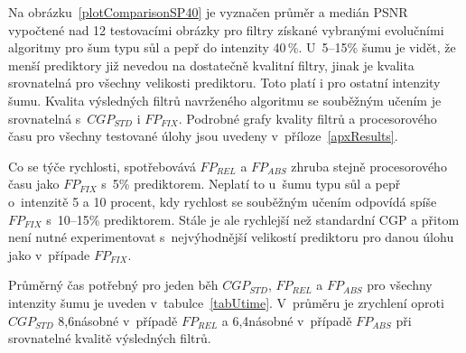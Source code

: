 Na obrázku~\ref{plotComparisonSP40} je vyznačen průměr a medián PSNR vypočtené nad 12 testovacími obrázky pro filtry získané vybranými evolučními algoritmy pro šum typu sůl a pepř do intenzity 40\,\%. U~5--15\% šumu je vidět, že menší prediktory již nevedou na dostatečně kvalitní filtry, jinak je kvalita srovnatelná pro všechny velikosti prediktoru. Toto platí i pro ostatní intenzity šumu. Kvalita výsledných filtrů navrženého algoritmu se souběžným učením je srovnatelná s~$\mathit{CGP_{STD}}$ i $\mathit{FP_{FIX}}$. Podrobné grafy kvality filtrů a procesorového času pro všechny testované úlohy jsou uvedeny v~příloze~\ref{apxResults}.

Co se týče rychlosti, spotřebovává $\mathit{FP_{REL}}$ a $\mathit{FP_{ABS}}$ zhruba stejně procesorového času jako $\mathit{FP_{FIX}}$ s~5\% prediktorem. Neplatí to u~šumu typu sůl a pepř o~intenzitě 5 a 10 procent, kdy rychlost se souběžným učením odpovídá spíše $\mathit{FP_{FIX}}$ s~10--15\% prediktorem. Stále je ale rychlejší než standardní CGP a přitom není nutné experimentovat s~nejvýhodnější velikostí prediktoru pro danou úlohu jako v~případe $\mathit{FP_{FIX}}$.

Průměrný čas potřebný pro jeden běh $\mathit{CGP_{STD}}$, $\mathit{FP_{REL}}$ a $\mathit{FP_{ABS}}$ pro všechny intenzity šumu je uveden v~tabulce~\ref{tabUtime}. V~průměru je zrychlení oproti $\mathit{CGP_{STD}}$ 8,6násobné v~případě $\mathit{FP_{REL}}$ a 6,4násobné v~případě $\mathit{FP_{ABS}}$ při srovnatelné kvalitě výsledných filtrů.



